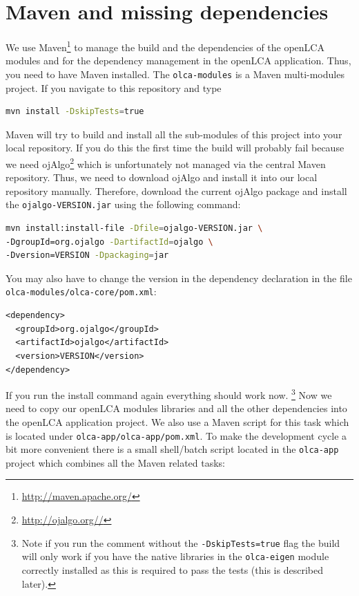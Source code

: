 \documentclass{scrreprt}
\begin{document}
\section{Maven and missing dependencies}
We use Maven\footnote{\url{http://maven.apache.org/}} to manage the build and the dependencies of the openLCA modules and for the dependency management in the openLCA application. Thus, you need to have Maven installed. 
The \texttt{olca-modules} is a Maven multi-modules project. If you navigate to this repository and type

\begin{lstlisting}[language=bash]
mvn install -DskipTests=true
\end{lstlisting}    

Maven will try to build and install all the sub-modules of this project into your local repository. If you do this the first time the build will probably fail because we need ojAlgo\footnote{\url{http://ojalgo.org//}} which is unfortunately not managed via the central Maven repository. Thus, we need to download ojAlgo and install it into our local repository manually. Therefore, download the current ojAlgo package and install the \texttt{ojalgo-VERSION.jar} using the following command:

\begin{lstlisting}[language=bash]
mvn install:install-file -Dfile=ojalgo-VERSION.jar \ 
-DgroupId=org.ojalgo -DartifactId=ojalgo \
-Dversion=VERSION -Dpackaging=jar
\end{lstlisting}

You may also have to change the version in the dependency declaration in the file \texttt{olca-modules/olca-core/pom.xml}:

\begin{lstlisting}
<dependency>
  <groupId>org.ojalgo</groupId>
  <artifactId>ojalgo</artifactId>
  <version>VERSION</version>
</dependency>
\end{lstlisting} 

If you run the install command again everything should work now. \footnote{Note if you run the comment without the \texttt{-DskipTests=true} flag the build will only work if you have the native libraries in the \texttt{olca-eigen} module correctly installed as this is required to pass the tests (this is described later).} Now we need to copy our openLCA modules libraries and all the other dependencies into the openLCA application project. We also use a Maven script for this task which is located under \texttt{olca-app/olca-app/pom.xml}. To make the development cycle a bit more convenient there is a small shell/batch script located in the \texttt{olca-app} project which combines all the Maven related tasks:
\end{document}
